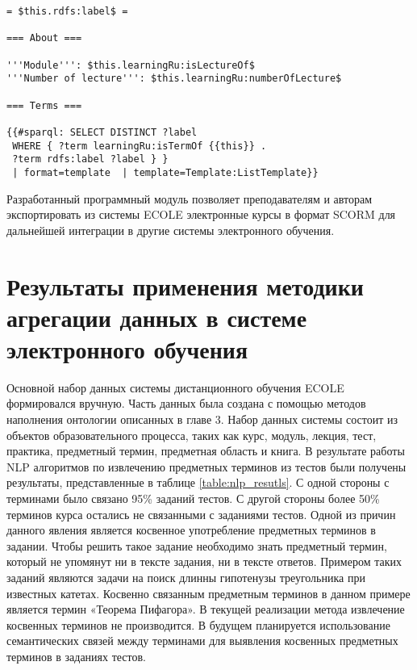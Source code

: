 \begin{lstlisting}
= $this.rdfs:label$ =

=== About ===

'''Module''': $this.learningRu:isLectureOf$
'''Number of lecture''': $this.learningRu:numberOfLecture$ 

=== Terms ===

{{#sparql: SELECT DISTINCT ?label
 WHERE { ?term learningRu:isTermOf {{this}} . 
 ?term rdfs:label ?label } } 
 | format=template  | template=Template:ListTemplate}}

\end{lstlisting}

Разработанный программный модуль позволяет преподавателям и авторам экспортировать из системы ECOLE электронные курсы в формат SCORM для дальнейшей интеграции в другие системы электронного обучения. 

\section{Результаты применения методики агрегации данных в системе электронного обучения} \label{sect4_4}

Основной набор данных системы дистанционного обучения ECOLE формировался вручную. Часть данных была создана с помощью методов наполнения онтологии описанных в главе 3. Набор данных системы состоит из объектов образовательного процесса, таких как курс, модуль, лекция, тест, практика, предметный термин, предметная область и книга. В результате работы NLP  алгоритмов по извлечению предметных терминов из тестов были получены результаты, представленные в таблице \ref{table:nlp_resutls}. С одной стороны с терминами было связано 95\% заданий тестов. С другой стороны более 50\% терминов курса остались не связанными с заданиями тестов. Одной из причин данного явления является косвенное употребление предметных терминов в задании. Чтобы решить такое задание необходимо знать предметный термин, который не упомянут ни в тексте задания, ни в тексте ответов. Примером таких заданий являются задачи на поиск длинны гипотенузы треугольника при известных катетах. Косвенно связанным предметным терминов в данном примере является термин «Теорема Пифагора». В текущей реализации метода извлечение косвенных терминов не производится. В будущем планируется использование семантических связей между терминами для выявления косвенных предметных терминов в заданиях тестов.

